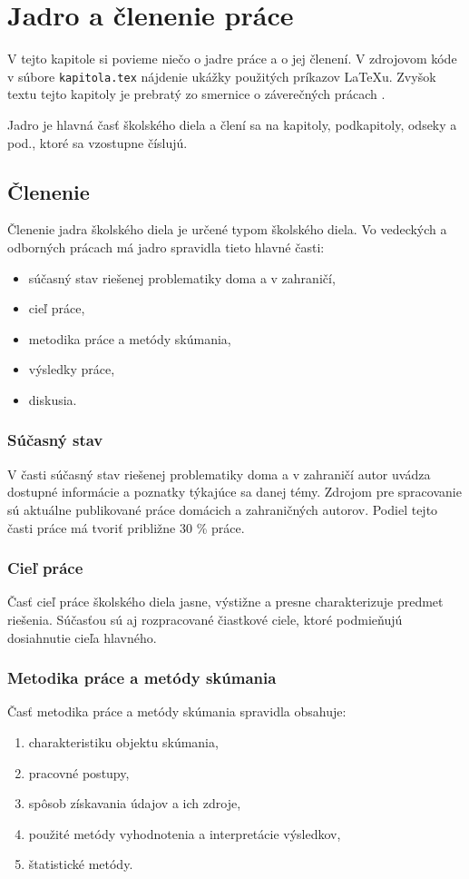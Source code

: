 \chapter{Jadro a členenie práce}

\label{kap:clenenie} %

V tejto kapitole si povieme niečo o jadre práce a o jej členení. V
zdrojovom kóde v súbore \verb'kapitola.tex' nájdenie ukážky použitých
príkazov LaTeXu. Zvyšok textu tejto kapitoly je prebratý zo smernice o
záverečných prácach \cite[článok 5]{smernica}.

Jadro je hlavná časť školského diela a člení sa na kapitoly, podkapitoly, odseky a pod., 
ktoré sa vzostupne číslujú.

\section{Členenie}
Členenie jadra školského diela je určené typom  školského diela. Vo vedeckých 
a odborných prácach má jadro spravidla tieto hlavné časti:
\begin{itemize}
\item  súčasný stav riešenej problematiky doma a v zahraničí,
\item  cieľ práce,
\item  metodika práce a metódy skúmania,
\item  výsledky práce, 
\item  diskusia. 
\end{itemize}

\subsection{Súčasný stav}
V časti súčasný stav riešenej problematiky doma a v zahraničí autor uvádza 
dostupné informácie a poznatky týkajúce sa danej témy. Zdrojom pre spracovanie sú 
aktuálne publikované práce domácich a zahraničných autorov.  Podiel tejto časti práce 
má tvoriť približne 30 \% práce.

\subsection{Cieľ práce}
Časť cieľ práce  školského diela jasne, výstižne a presne charakterizuje predmet 
riešenia. Súčasťou sú aj rozpracované čiastkové ciele, ktoré podmieňujú dosiahnutie 
cieľa hlavného. 

\subsection{Metodika práce a metódy skúmania}
Časť metodika práce a metódy skúmania spravidla obsahuje:
\begin{enumerate}
\item  charakteristiku objektu skúmania,  
\item  pracovné postupy, 
\item  spôsob získavania údajov a ich zdroje, 
\item  použité metódy vyhodnotenia a interpretácie výsledkov,
\item  štatistické metódy.
\end{enumerate}

